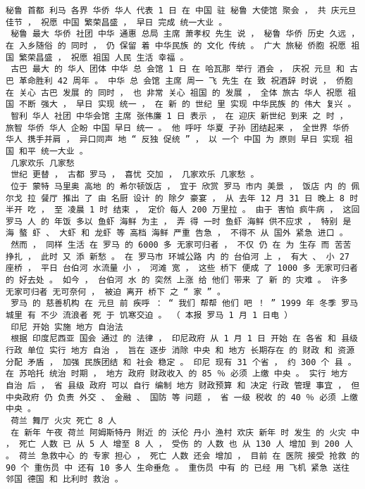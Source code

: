 \documentclass{article}
\begin{document}
\begin{Verbatim}[commandchars=\\\{\}]
 秘鲁 首都 利马 各界 华侨 华人 代表 1 日 在 中国 驻 秘鲁 大使馆 聚会 ， 共 庆元旦 佳节 ， 祝愿 中国 繁荣昌盛 ， 早日 完成 统一大业 。 
 秘鲁 最大 华侨 社团 中华 通惠 总局 主席 萧孝权 先生 说 ， 秘鲁 华侨 历史 久远 ， 在 入乡随俗 的 同时 ， 仍 保留 着 中华民族 的 文化 传统 。 广大 旅秘 侨胞 祝愿 祖国 繁荣昌盛 ， 祝愿 祖国 人民 生活 幸福 。 
 古巴 最大 的 华人 团体 中华 总 会馆 1 日 在 哈瓦那 举行 酒会 ， 庆祝 元旦 和 古巴 革命胜利 42 周年 。 中华 总 会馆 主席 周一 飞 先生 在 致 祝酒辞 时说 ， 侨胞 在 关心 古巴 发展 的 同时 ， 也 非常 关心 祖国 的 发展 ， 全体 旅古 华人 祝愿 祖国 不断 强大 ， 早日 实现 统一 ， 在 新 的 世纪 里 实现 中华民族 的 伟大 复兴 。 
 智利 华人 社团 中华会馆 主席 张伟廉 1 日 表示 ， 在 迎庆 新世纪 到来 之 时 ， 旅智 华侨 华人 企盼 中国 早日 统一 。 他 呼吁 华夏 子孙 团结起来 ， 全世界 华侨 华人 携手并肩 ， 异口同声 地 “ 反独 促统 ” ， 以 一个 中国 为 原则 早日 实现 祖国 和平 统一大业 。 
 几家欢乐 几家愁 
 世纪 更替 ， 古都 罗马 ， 喜忧 交加 ， 几家欢乐 几家愁 。 
 位于 蒙特 马里奥 高地 的 希尔顿饭店 ， 宜于 欣赏 罗马 市内 美景 ， 饭店 内 的 佩尔戈 拉 餐厅 推出 了 由 名厨 设计 的 除夕 豪宴 ， 从 去年 12 月 31 日 晚上 8 时 半开 吃 ， 至 凌晨 1 时 结束 ， 定价 每人 200 万里拉 。 由于 害怕 疯牛病 ， 这回 罗马 人 的 年饭 多以 鱼虾 海鲜 为主 ， 弄 得 一时 鱼虾 海鲜 供不应求 ， 特别 是 海 螯 虾 、 大虾 和 龙虾 等 高档 海鲜 严重 告急 ， 不得不 从 国外 紧急 进口 。 
 然而 ， 同样 生活 在 罗马 的 6000 多 无家可归者 ， 不仅 仍 在 为 生存 而 苦苦 挣扎 ， 此时 又 添 新愁 。 在 罗马市 环城公路 内 的 台伯河 上 ， 有大 、 小 27 座桥 ， 平日 台伯河 水流量 小 ， 河滩 宽 ， 这些 桥下 便成 了 1000 多 无家可归者 的 好去处 。 如今 ， 台伯河 水 的 突然 上涨 给 他们 带来 了 新 的 灾难 。 许多 无家可归者 无可奈何 ， 被迫 离开 桥下 之 “ 家 ” 。 
 罗马 的 慈善机构 在 元旦 前 疾呼 ： “ 我们 帮帮 他们 吧 ！ ” 1999 年 冬季 罗马 城里 有 不少 流浪者 死 于 饥寒交迫 。 （ 本报 罗马 1 月 1 日电 ） 
 印尼 开始 实施 地方 自治法 
 根据 印度尼西亚 国会 通过 的 法律 ， 印尼政府 从 1 月 1 日 开始 在 各省 和 县级 行政 单位 实行 地方 自治 ， 旨在 逐步 消除 中央 和 地方 长期存在 的 财政 和 资源分配 矛盾 ， 加强 民族团结 和 社会 稳定 。 印尼 现有 31 个省 ， 约 300 个 县 。 在 苏哈托 统治 时期 ， 地方 政府 财政收入 的 85 ％ 必须 上缴 中央 。 实行 地方 自治 后 ， 省 县级 政府 可以 自行 编制 地方 财政预算 和 决定 行政 管理 事宜 ， 但 中央政府 仍 负责 外交 、 金融 、 国防 等 问题 ， 省 一级 税收 的 40 ％ 必须 上缴 中央 。 
 荷兰 舞厅 火灾 死亡 8 人 
 在 新年 午夜 荷兰 阿姆斯特丹 附近 的 沃伦 丹小 渔村 欢庆 新年 时 发生 的 火灾 中 ， 死亡 人数 已 从 5 人 增至 8 人 ， 受伤 的 人数 也 从 130 人 增加 到 200 人 。 荷兰 急救中心 的 专家 担心 ， 死亡 人数 还会 增加 ， 目前 在 医院 接受 抢救 的 90 个 重伤员 中 还有 10 多人 生命垂危 。 重伤员 中有 的 已经 用 飞机 紧急 送往 邻国 德国 和 比利时 救治 。 

\end{Verbatim}
\end{document}
